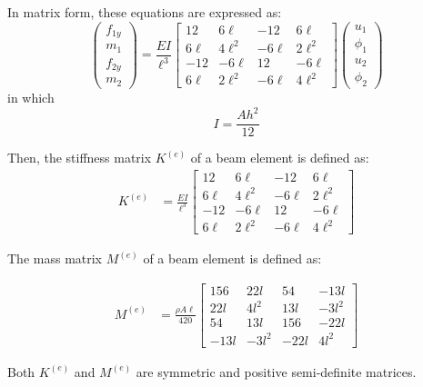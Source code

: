 In matrix form, these equations are expressed as:
%
\begin{equation}
    \begin{pmatrix} f_{1y} \\ m_1 \\ f_{2y} \\ m_2 \end{pmatrix} = \frac{EI}{\ell^3} \begin{bmatrix}
    12 & 6\ell & -12 & 6\ell \\
    6\ell & 4\ell^2 & -6\ell & 2\ell^2 \\
    -12 & -6\ell & 12 & -6\ell \\
    6\ell & 2\ell^2 & -6\ell & 4\ell^2
\end{bmatrix}\begin{pmatrix} u_1 \\ \phi_1 \\ u_2 \\ \phi_2 \end{pmatrix}
\end{equation}
%
in which
%
\begin{equation}
    I = \frac{A h^2}{12}
\end{equation}

Then, the stiffness matrix $K^{(e)}$ of a beam element is defined as:
%
\begin{align}
    K^{(e)} &= \frac{EI}{\ell^3} \begin{bmatrix}
    12 & 6\ell & -12 & 6\ell \\
    6\ell & 4\ell^2 & -6\ell & 2\ell^2 \\
    -12 & -6\ell & 12 & -6\ell \\
    6\ell & 2\ell^2 & -6\ell & 4\ell^2
\end{bmatrix}
\end{align}

The mass matrix $M^{(e)}$ of a beam element is defined as:

\begin{align}
M^{(e)} &= \frac{\rho A \ell}{420} \begin{bmatrix}
    156 & 22l & 54 & -13l \\
    22l & 4l^2 & 13l & -3l^2 \\
    54 & 13l & 156 & -22l \\
    -13l & -3l^2 & -22l & 4l^2
\end{bmatrix}
\end{align}

Both $K^{(e)}$ and $M^{(e)}$ are symmetric and positive semi-definite matrices.

